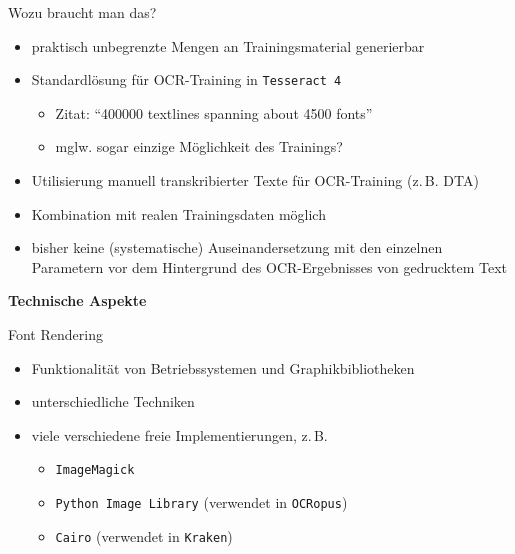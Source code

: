 \documentclass{bbawslides}
\begin{document}
\begin{bbawslide}{Wozu braucht man das?}
  \vspace*{7mm}%
  \centerslidestrue%
  \begin{itemize}
    \item praktisch unbegrenzte Mengen an Trainingsmaterial generierbar
    \item Standardlösung für OCR-Training in \texttt{Tesseract 4}
    \begin{itemize}\small
       \item Zitat: \enquote{400000 textlines spanning about 4500 fonts}
       \item mglw. sogar einzige Möglichkeit des Trainings?
    \end{itemize}
    \item Utilisierung manuell transkribierter Texte für OCR-Training (z.\,B. DTA)
    \item Kombination mit realen Trainingsdaten möglich
    \item bisher keine (systematische) Auseinandersetzung mit den einzelnen Parametern vor dem Hintergrund des OCR-Ergebnisses von gedrucktem Text
  \end{itemize}
\end{bbawslide}

\begin{bbawpart}{\Large\bf Technische Aspekte}
\end{bbawpart}

\begin{bbawslide}{Font Rendering}
  \vspace*{7mm}%
  \centerslidestrue%
  \begin{itemize}
    \item Funktionalität von Betriebssystemen und Graphikbibliotheken
    \item unterschiedliche Techniken
    \item viele verschiedene freie Implementierungen, z.\,B.
    \begin{itemize}\small
      \item \texttt{ImageMagick}
      \item \texttt{Python Image Library} (verwendet in \texttt{OCRopus})
      \item \texttt{Cairo} (verwendet in \texttt{Kraken})
    \end{itemize}
  \end{itemize}
\end{bbawslide}
\end{document}
